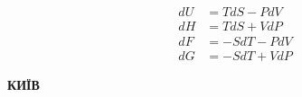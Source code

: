 {\begin{alwayssingle}
\begin{center}
\begin{tcolorbox}
			\Huge\sffamily\bfseries\textcolor{white}{\realtitle}\\
			\huge\sffamily\bfseries\textcolor{white}{\subtitle}
			\end{tcolorbox}
			\vfill
		 	\begin{Large}\color{themecolordark!90!black}
			\begin{align*}
                dU &= T dS - P dV  \\
                dH &= T dS + V dP  \\
                dF &= -S dT - P dV \\
                dG &= -S dT + V dP
			\end{align*}
			\end{Large}
			\vfill
			\begin{tcolorbox}[titlepagestyle,
					toprule=0.10cm,
					bottomrule=0.10cm]
				\begin{center}\color{white}\bfseries\normalsize
					\MakeUppercase{Київ~\the\year} \\
				\end{center}
			\end{tcolorbox}
		\end{center}
		\clearpage
	\end{alwayssingle}
\setcounter{page}{1}
}


%
%

